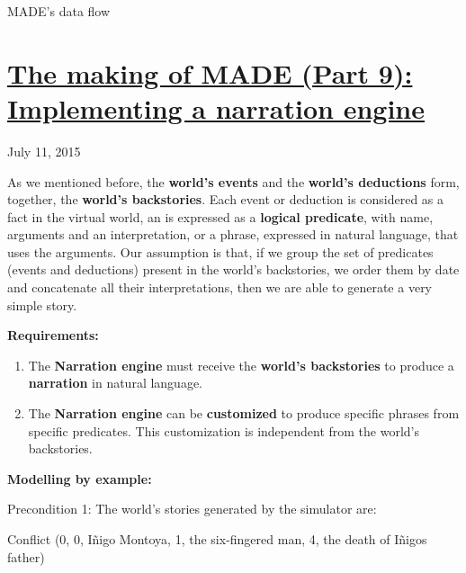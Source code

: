 \documentclass[a4paper]{article}
\newcommand\textstyleStrongEmphasis[1]{\textbf{#1}}
\newcommand\liststyleLviii{%
\renewcommand\theenumi{\arabic{enumi}}
\renewcommand\theenumii{\arabic{enumii}}
\renewcommand\theenumiii{\arabic{enumiii}}
\renewcommand\theenumiv{\arabic{enumiv}}
\renewcommand\labelenumi{\theenumi.}
\renewcommand\labelenumii{\theenumii.}
\renewcommand\labelenumiii{\theenumiii.}
\renewcommand\labelenumiv{\theenumiv.}
}
\begin{document}
MADE{\textquoteright}s data flow

\bigskip

\clearpage\section[The making of MADE (Part 9): Implementing a narration
engine]{\href{http://www.velonuboso.com/made/2015/07/11/making-part-7-testing-narration-engine/}{The
making of MADE (Part 9): Implementing a narration engine}}
July 11, 2015

As we mentioned before, the
\textstyleStrongEmphasis{world{\textquoteright}s events} and the
\textstyleStrongEmphasis{world{\textquoteright}s deductions} form,
together, the \textstyleStrongEmphasis{world{\textquoteright}s
backstories}. Each event or deduction is considered as a fact in the
virtual world, an is expressed as a \textstyleStrongEmphasis{logical
predicate}, with name, arguments and an interpretation, or a phrase,
expressed in natural language, that uses the arguments. Our assumption
is that, if we group the set of predicates (events and deductions)
present in the world{\textquoteright}s backstories, we order them by
date and concatenate all their interpretations, then we are able to
generate a very simple story.

\textstyleStrongEmphasis{Requirements:}

\liststyleLviii
\begin{enumerate}
\item The \textstyleStrongEmphasis{Narration engine} must receive the
\textstyleStrongEmphasis{world{\textquoteright}s backstories} to
produce a \textstyleStrongEmphasis{narration} in natural language. 
\item The \textstyleStrongEmphasis{Narration engine} can be
\textstyleStrongEmphasis{customized} to produce specific phrases from
specific predicates. This customization is independent from the
world{\textquoteright}s backstories. 
\end{enumerate}
\textstyleStrongEmphasis{Modelling by example:}

Precondition 1: The world{\textquoteright}s stories generated by the
simulator are:

{\ttfamily
Conflict (0, 0, {\textquotesingle}I\~nigo Montoya{\textquotesingle}, 1,
{\textquotesingle}the {\textquotedbl}six-fingered
man{\textquotedbl}{\textquotesingle},
{\textquotesingle}4{\textquotesingle}, {\textquotesingle}the death of
I\~nigo{\textquotesingle}s father{\textquotesingle})}
\end{document}
